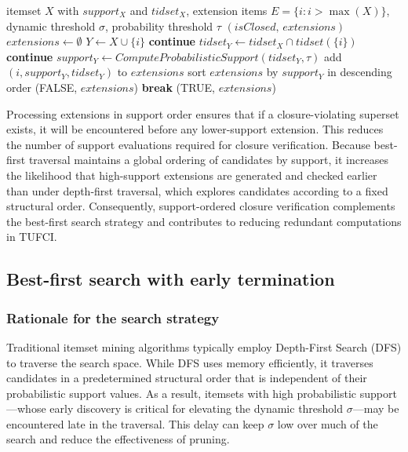 \documentclass[10pt,letterpaper]{article}
\begin{document}
\begin{algorithm}[!h]
\caption{SupportOrderedClosureCheck}
\label{alg:closure-check}
\begin{algorithmic}[1]
\REQUIRE itemset $X$ with $support_X$ and $tidset_X$, extension items $E=\{i: i>\max(X)\}$, dynamic threshold $\sigma$, probability threshold $\tau$
\ENSURE $(isClosed,\, extensions)$
\STATE $extensions \leftarrow \emptyset$
    \STATE $Y \leftarrow X \cup \{i\}$
     \textbf{continue} \ENDIF
    \STATE $tidset_Y \leftarrow tidset_X \cap tidset(\{i\})$
     \textbf{continue} \ENDIF
    \STATE $support_Y \leftarrow ComputeProbabilisticSupport(tidset_Y,\tau)$
        \STATE add $(i, support_Y, tidset_Y)$ to $extensions$
    \ENDIF
\ENDFOR
\STATE sort $extensions$ by $support_Y$ in descending order
        \RETURN (FALSE, $extensions$) 
        \STATE \textbf{break}
    \ENDIF
\ENDFOR
\RETURN (TRUE, $extensions$)
\end{algorithmic}
\end{algorithm}

Processing extensions in support order ensures that if a closure-violating superset exists, it will be encountered before any lower-support extension. This reduces the number of support evaluations required for closure verification. Because best-first traversal maintains a global ordering of candidates by support, it increases the likelihood that high-support extensions are generated and checked earlier than under depth-first traversal, which explores candidates according to a fixed structural order. Consequently, support-ordered closure verification complements the best-first search strategy and contributes to reducing redundant computations in TUFCI.
\subsection*{Best-first search with early termination}

\subsubsection*{Rationale for the search strategy}

Traditional itemset mining algorithms typically employ Depth-First Search (DFS) to traverse the search space. While DFS uses memory efficiently, it traverses candidates in a predetermined structural order that is independent of their probabilistic support values. As a result, itemsets with high probabilistic support—whose early discovery is critical for elevating the dynamic threshold \(\sigma\)—may be encountered late in the traversal. This delay can keep \(\sigma\) low over much of the search and reduce the effectiveness of pruning.
\end{document}
